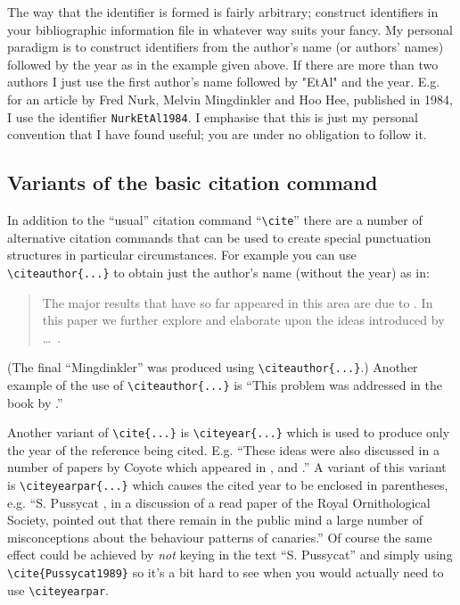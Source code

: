 \documentclass[times, doublespace]{anzsauth}
\begin{document}
The way that the identifier is formed is fairly arbitrary; construct
identifiers in your bibliographic information file in whatever way
suits your fancy.  My personal paradigm is to construct identifiers
from the author's name (or authors' names) followed by the year as
in the example given above.  If there are more than two authors I
just use the first author's name followed by "EtAl" and the year.
E.g. for an article by Fred Nurk, Melvin Mingdinkler and Hoo Hee,
published in 1984, I use the identifier \texttt{NurkEtAl1984}.
I emphasise that this is just my personal convention that I have
found useful; you are under no obligation to follow it.

\subsection{Variants of the basic citation command}
\label{sec:citeVar}

In addition to the ``usual'' citation command ``\verb!\cite!''
there are a number of alternative citation commands that can be used
to create special punctuation structures in particular circumstances.
For example you can use \verb!\citeauthor{...}! to obtain just the
author's name (without the year) as in:
\begin{quote}
The major results that have so far appeared in this area are due
to \cite{Mingdinkler1999}.  In this paper we further explore and
elaborate upon the ideas introduced by \citeauthor{Mingdinkler1999}
\ldots~.
\end{quote}
(The final ``Mingdinkler'' was produced using \verb!\citeauthor{...}!.)
Another example of the use of \verb!\citeauthor{...}! is
``This problem was addressed in the book by
\citeauthor{Thecowsoutside1984}.''

Another variant of \verb!\cite{...}! is \verb!\citeyear{...}!
which is used to produce only the year of the reference being cited.
E.g. ``These ideas were also discussed in a number of papers by
Coyote which appeared in \citeyear{Coyote2001}, \citeyear{Coyote2007}
and \citeyear{Coyote2010}.''  A variant of this variant is
\verb!\citeyearpar{...}! which causes the cited year to be enclosed
in parentheses, e.g. ``S. Pussycat \citeyearpar{Pussycat1989}, in
a discussion of a read paper of the Royal Ornithological Society,
pointed out that there remain in the public mind a large number of
misconceptions about the behaviour patterns of canaries.''
Of course the same effect could be achieved by \emph{not}
keying in the text ``S. Pussycat'' and simply using
\verb!\cite{Pussycat1989}! so it's a bit hard to see when you
would actually need to use \verb!\citeyearpar!.
\end{document}
